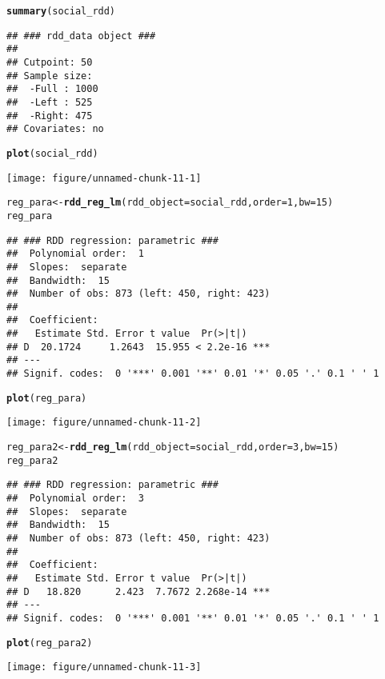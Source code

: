 \documentclass[12pt]{article}\usepackage[]{graphicx}\usepackage[]{color}
\makeatletter
\def\maxwidth{ %
  \ifdim\Gin@nat@width>\linewidth
    \linewidth
  \else
    \Gin@nat@width
  \fi
}
\newcommand{\hlnum}[1]{\textcolor[rgb]{0.686,0.059,0.569}{#1}}%
\newcommand{\hlstd}[1]{\textcolor[rgb]{0.345,0.345,0.345}{#1}}%
\newcommand{\hlkwb}[1]{\textcolor[rgb]{0.69,0.353,0.396}{#1}}%
\newcommand{\hlkwc}[1]{\textcolor[rgb]{0.333,0.667,0.333}{#1}}%
\newcommand{\hlkwd}[1]{\textcolor[rgb]{0.737,0.353,0.396}{\textbf{#1}}}%
\newenvironment{kframe}{%
 \def\at@end@of@kframe{}%
 \ifinner\ifhmode%
  \def\at@end@of@kframe{\end{minipage}}%
  \begin{minipage}{\columnwidth}%
 \fi\fi%
 \def\FrameCommand##1{\hskip\@totalleftmargin \hskip-\fboxsep
 \colorbox{shadecolor}{##1}\hskip-\fboxsep
     \hskip-\linewidth \hskip-\@totalleftmargin \hskip\columnwidth}%
 \MakeFramed {\advance\hsize-\width
   \@totalleftmargin\z@ \linewidth\hsize
   \@setminipage}}%
 {\par\unskip\endMakeFramed%
 \at@end@of@kframe}
\newenvironment{knitrout}{}{} %
\makeatother
\begin{document}
\begin{knitrout}
\begin{kframe}
\begin{alltt}
\hlkwd{summary}\hlstd{(social_rdd)}
\end{alltt}
\begin{verbatim}
## ### rdd_data object ###
## 
## Cutpoint: 50 
## Sample size: 
## 	-Full : 1000 
## 	-Left : 525 
## 	-Right: 475
## Covariates: no
\end{verbatim}
\begin{alltt}
\hlkwd{plot}\hlstd{(social_rdd)}
\end{alltt}
\end{kframe}
\texttt{[image: figure/unnamed-chunk-11-1]} 
\begin{kframe}\begin{alltt}
\hlstd{reg_para} \hlkwb{<-} \hlkwd{rdd_reg_lm}\hlstd{(}\hlkwc{rdd_object} \hlstd{= social_rdd,} \hlkwc{order} \hlstd{=} \hlnum{1}\hlstd{,} \hlkwc{bw} \hlstd{=} \hlnum{15}\hlstd{)}
\hlstd{reg_para}
\end{alltt}
\begin{verbatim}
## ### RDD regression: parametric ###
## 	Polynomial order:  1 
## 	Slopes:  separate 
## 	Bandwidth:  15 
## 	Number of obs: 873 (left: 450, right: 423)
## 
## 	Coefficient:
##   Estimate Std. Error t value  Pr(>|t|)    
## D  20.1724     1.2643  15.955 < 2.2e-16 ***
## ---
## Signif. codes:  0 '***' 0.001 '**' 0.01 '*' 0.05 '.' 0.1 ' ' 1
\end{verbatim}
\begin{alltt}
\hlkwd{plot}\hlstd{(reg_para)}
\end{alltt}
\end{kframe}
\texttt{[image: figure/unnamed-chunk-11-2]} 
\begin{kframe}\begin{alltt}
\hlstd{reg_para2} \hlkwb{<-} \hlkwd{rdd_reg_lm}\hlstd{(}\hlkwc{rdd_object} \hlstd{= social_rdd,} \hlkwc{order} \hlstd{=} \hlnum{3}\hlstd{,} \hlkwc{bw} \hlstd{=} \hlnum{15}\hlstd{)}
\hlstd{reg_para2}
\end{alltt}
\begin{verbatim}
## ### RDD regression: parametric ###
## 	Polynomial order:  3 
## 	Slopes:  separate 
## 	Bandwidth:  15 
## 	Number of obs: 873 (left: 450, right: 423)
## 
## 	Coefficient:
##   Estimate Std. Error t value  Pr(>|t|)    
## D   18.820      2.423  7.7672 2.268e-14 ***
## ---
## Signif. codes:  0 '***' 0.001 '**' 0.01 '*' 0.05 '.' 0.1 ' ' 1
\end{verbatim}
\begin{alltt}
\hlkwd{plot}\hlstd{(reg_para2)}
\end{alltt}
\end{kframe}
\texttt{[image: figure/unnamed-chunk-11-3]} 

\end{knitrout}
\end{document}
